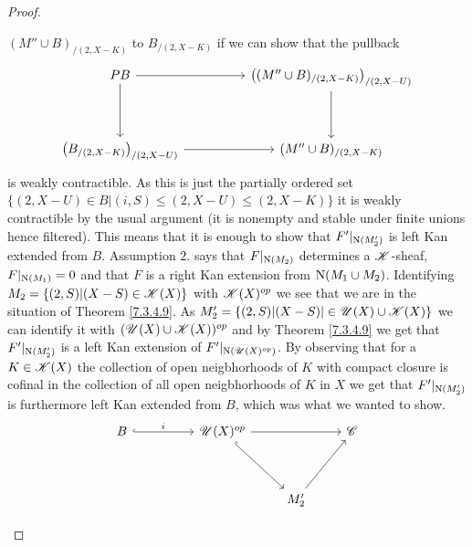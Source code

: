 \documentclass[../../thesis.tex]{subfiles}
\begin{document}
\begin{proof}
\begin{enumerate}[label=(\alph*)]
              $(M''\cup B)_{/(2,X-K)}$ to $B_{/(2,X-K)}$ if we can show that the pullback
              \[\begin{tikzcd}
                      PB && {\left((M''\cup B)_{/(2,X-K)}\right)_{/(2,X-U)}} \\
                      \\
                      {\left(B_{/(2,X-K)}\right)_{/(2,X-U)}} && {(M''\cup B)_{/(2,X-K)}}
                      \arrow[from=1-1, to=1-3]
                      \arrow[from=1-3, to=3-3]
                      \arrow[from=3-1, to=3-3]
                      \arrow[from=1-1, to=3-1]
                  \end{tikzcd}\]
              is weakly contractible.
              As this is just the partially ordered set $\{(2,X-U)\in B | (i,S) \leq (2,X-U) \leq (2,X-K)\}$ it is weakly contractible by the usual argument (it is nonempty and stable under finite unions hence filtered).
              This means that it is enough to show that $F'|_{\mathrm{N}(M_2')}$ is left Kan extended from $B$.
              Assumption $2.$ says that $F|_{\mathrm{N}(M_2)}$ determines a $\mathscr{K}$-sheaf, $F|_{\mathrm{N}(M_1)}=0$ and that $F$ is a right Kan extension from $\mathrm{N}(M_1 \cup M_2)$.
              Identifying $M_2 = \{(2, S) | (X-S) \in \mathscr{K}(X)\}$ with $\mathscr{K}(X)^{op}$ we see that we are in the situation of Theorem \ref{7.3.4.9}.
              As $M_2' = \{(2,S) | (X-S) | \in \mathscr{U}(X) \cup \mathscr{K}(X)\}$ we can identify it with $(\mathscr{U}(X) \cup \mathscr{K}(X))^{op}$ and by Theorem \ref{7.3.4.9} we get that $F'|_{\mathrm{N}(M_2')}$ is a left Kan extension of $F'|_{\mathrm{N}(\mathscr{U}(X)^{op})}$.
              By observing that for a $K \in \mathscr{K}(X)$ the collection of open neigbhorhoods of $K$ with compact closure is cofinal in the collection of all open neigbhorhoods of $K$ in $X$ we get that $F'|_{\mathrm{N}(M_2')}$ is furthermore left Kan extended from $B$, which was what we wanted to show.
              \[\begin{tikzcd}
                      B && {\Open(X)^{op}} && \C \\
                      \\
                      &&& {M_2'}
                      \arrow[hook, from=1-3, to=3-4]
                      \arrow[from=1-3, to=1-5]
                      \arrow[from=3-4, to=1-5]
                      \arrow["i", hook, from=1-1, to=1-3]
                  \end{tikzcd}\]

\end{enumerate}
\end{proof}
\end{document}
